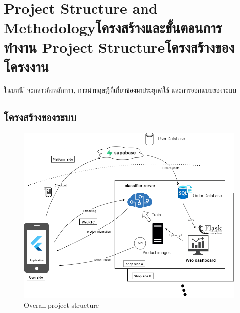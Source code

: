 \chapter{\ifproject%
\ifenglish Project Structure and Methodology\else โครงสร้างและขั้นตอนการทำงาน\fi
\else%
\ifenglish Project Structure\else โครงสร้างของโครงงาน\fi
\fi
}

ในบทนี ้ จะกล่าวถึงหลักการ,  การนําทฤษฎีที่เกี่ยวข้องมาประยุกต์ใช้  และการออกแบบของระบบ


\makeatletter


\makeatother
\section{โครงสร้างของระบบ}
\begin{figure}[h]
  \begin{center}
  \vspace{0.5cm}\includegraphics[scale=0.5]{pic/overall_2.png}
  \end{center}
  
  \caption[Overall project structure]{Overall project structure}
  \label{fig:Overall project structure}
  \end{figure}
